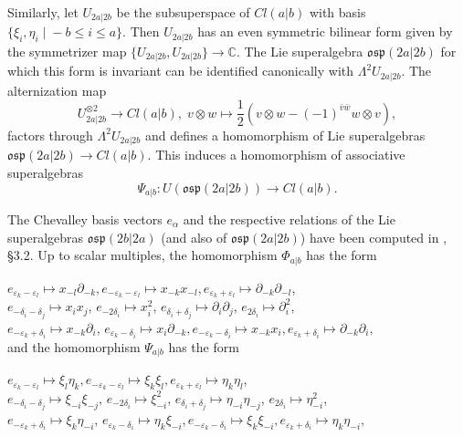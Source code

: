 \documentclass[12pt]{amsart}
\makeatletter
\def\@putname#1#2#3#4{\def\@@ref{#3}\let\old@bf\bf
        \def\bf##1{\old@bf\if?\noexpand##1?{#4}\else##1\fi}%
	#1{#2}%
        \let\bf\old@bf}
\def\@putname#1#2#3#4{\def\@@ref{#3}\let\old@bf\bf	%
	\let\old@reset@font\reset@font			%
        \def\bf##1{\old@bf\if?\noexpand##1?{#4}\else##1\fi}%
	\def\reset@font##1##2{\old@reset@font##1\if?\noexpand##2?{#4}\else##2\fi}#1{#2}%
        \let\bf\old@bf\let\reset@font\old@reset@font}
\let\my@cite=\cite
\def\cite#1{\@putname\my@cite{#1}{\@citeb}{\tiny\rm\@@ref}}
\theoremstyle{plain} %
\numberwithin{equation}{section}
\theoremstyle{definition}
\theoremstyle{remark}
\theoremstyle{plain} %
\newcommand{\osp}{\mathfrak{osp}}
\makeatother
\begin{document}
Similarly, let $U_{2a|2b}$ be the subsuperspace of $Cl(a|b)$ with basis $\{\xi_i,\eta_i \; | \; -b \leq i \leq  a \}$. Then $U_{2a|2b}$ has an even  symmetric bilinear form given by the symmetrizer map $\{U_{2a|2b},U_{2a|2b}\}\to\mathbb C$. The Lie superalgebra
$\osp(2a|2b)$ %
for which this form is invariant can be identified canonically with $\Lambda^2 U_{2a|2b} $. The  alternization map 
$$
U_{2a|2b}^{\otimes 2} \to Cl(a|b), \; v\otimes w \mapsto \frac{1}{2} \left( v\otimes w  - (-1)^{\bar{v}\bar{w}} w \otimes v\right),
$$  
factors through  $\Lambda^2 U_{2a|2b} $  and  defines a homomorphism of Lie superalgebras\\ $\osp(2a|2b)\to Cl(a|b)$. This  
induces a homomorphism of associative superalgebras $$\Psi_{a|b}:U(\osp(2a|2b))\to Cl(a|b).$$

The Chevalley basis vectors $e_{\alpha}$ and the respective relations of the Lie superalgebras $\osp(2b|2a)$  (and also of $\osp(2a|2b)$) have been computed in \cite{FG},  \S 3.2. Up to scalar multiples, 
 the homomorphism $\Phi_{a|b}$ has the form 
 
\noindent $e_{\varepsilon_k  - \varepsilon_l } \mapsto x_{-l} \partial_{-k}, e_{-\varepsilon_k - \varepsilon_l }  \mapsto x_{-k} x_{-l}, e_{\varepsilon_k  + \varepsilon_l} \mapsto \partial_{-k} \partial_{-l} $, \\
$e_{-\delta_i - \delta_j} \mapsto x_{i}x_{j}$, $e_{-2\delta_i} \mapsto x_{i}^2$, $e_{\delta_{i} + \delta_{j}} \mapsto \partial_{i}\partial_{j}$, $e_{2\delta_i} \mapsto \partial_{i}^2$,\\
$e_{-\varepsilon_k + \delta_i} \mapsto x_{-k}\partial_{i}$, $e_{\varepsilon_k - \delta_i} \mapsto x_{i}\partial_{-k},  e_{-\varepsilon_k - \delta_i} \mapsto x_{-k} x_i, e_{\varepsilon_k + \delta_i} \mapsto \partial_{-k} \partial_{i},$ \\



\noindent and the homomorphism $\Psi_{a|b}$ has the form


\noindent $e_{\varepsilon_k  - \varepsilon_l } \mapsto \xi_{l} \eta_{k}, e_{-\varepsilon_k - \varepsilon_l }  \mapsto \xi_{k} \xi_{l}, e_{\varepsilon_k  + \varepsilon_l} \mapsto \eta_{k} \eta_{l}$, \\
$e_{-\delta_i - \delta_j} \mapsto \xi_{-i}\xi_{-j}$, $e_{-2\delta_i} \mapsto \xi_{-i}^2$, $e_{\delta_{i} + \delta_{j}} \mapsto \eta_{-i}\eta_{-j}$, $e_{2\delta_i} \mapsto \eta_{-i}^2$,\\
$e_{-\varepsilon_k + \delta_i} \mapsto \xi_{k}\eta_{-i}$, $e_{\varepsilon_k - \delta_i} \mapsto \eta_{k}\xi_{-i}, e_{-\varepsilon_k - \delta_i} \mapsto \xi_k\xi_{-i}, e_{\varepsilon_k + \delta_i} \mapsto \eta_k\eta_{-i},$ \\
\end{document}
